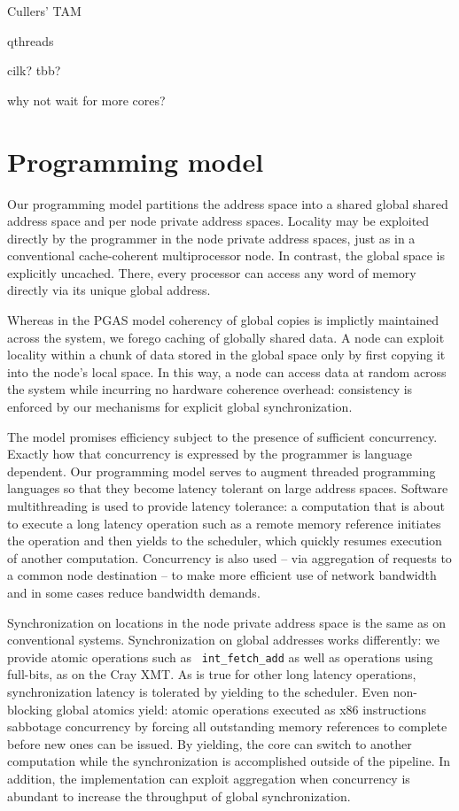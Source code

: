 \documentclass{acm_proc_article-sp}
\begin{document}
Cullers' TAM

qthreads

cilk? tbb?

why not wait for more cores?



\section{Programming model}
\label{sec:model}

Our programming model partitions the address space into a shared
global shared address space and per node private address spaces.
Locality may be exploited directly by the programmer in the node
private address spaces, just as in a conventional cache-coherent
multiprocessor node.  In contrast, the global space is explicitly
uncached.  There, every processor can access any word of memory
directly via its unique global address.  

Whereas in the PGAS model coherency of global copies is implictly
maintained across the system, we forego caching of globally shared
data.  A node can exploit locality within a chunk of data stored in
the global space only by first copying it into the node's local space.
In this way, a node can access data at random across the system while
incurring no hardware coherence overhead: consistency is enforced by
our mechanisms for explicit global synchronization.

The model promises efficiency subject to the presence of sufficient
concurrency.  Exactly how that concurrency is expressed by the
programmer is language dependent.  Our programming model serves to
augment threaded programming languages so that they become latency
tolerant on large address spaces.  Software multithreading is used to
provide latency tolerance: a computation that is about to execute a
long latency operation such as a remote memory reference initiates the
operation and then yields to the scheduler, which quickly resumes
execution of another computation.  Concurrency is also used -- via
aggregation of requests to a common node destination -- to make more
efficient use of network bandwidth and in some cases reduce bandwidth
demands.

Synchronization on locations in the node private address space is the
same as on conventional systems.  Synchronization on global addresses
works differently: we provide atomic operations such as {\tt
  int\_fetch\_add} as well as operations using full-bits, as on the
Cray XMT.  As is true for other long latency operations,
synchronization latency is tolerated by yielding to the scheduler.
Even non-blocking global atomics yield: atomic operations executed as
x86 instructions sabbotage concurrency by forcing all outstanding
memory references to complete before new ones can be issued.  By
yielding, the core can switch to another computation while the
synchronization is accomplished outside of the pipeline.  In addition,
the implementation can exploit aggregation when concurrency is
abundant to increase the throughput of global synchronization.
\end{document}

